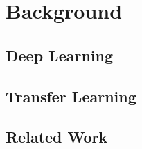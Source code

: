 \chapter{Background}
\label{Background}

\section{Deep Learning}
\section{Transfer Learning}
\section{Related Work}

